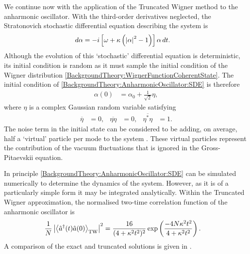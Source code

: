 We continue now with the application of the Truncated Wigner method to the anharmonic oscillator.  With the third-order derivatives neglected, the Stratonovich stochastic differential equation describing the system is
\begin{align}
    d \alpha &= -i \left[\omega + \kappa \left(\abs{\alpha}^2 - 1\right) \right] \alpha \, dt. \label{BackgroundTheory:AnharmonicOscillator:SDE}
\end{align}
Although the evolution of this `stochastic' differential equation is deterministic, its initial condition is random as it must sample the initial condition of the Wigner distribution \eqref{BackgroundTheory:WignerFunctionCoherentState}.  The initial condition of \eqref{BackgroundTheory:AnharmonicOscillator:SDE} is therefore
\begin{align}
    \alpha(0) &= \alpha_0 + \frac{1}{\sqrt{2}} \eta,
\end{align}
where $\eta$ is a complex Gaussian random variable satisfying
\begin{align}
    \overline{\eta} &= 0, & \overline{\eta \eta} &= 0, & \overline{\eta^* \eta} &= 1.
\end{align}
The noise term in the initial state can be considered to be adding, on average, half a `virtual' particle per mode to the system \citep{Scott:2007}.  These virtual particles represent the contribution of the vacuum fluctuations that is ignored in the Gross-Pitaevskii equation.

In principle \eqref{BackgroundTheory:AnharmonicOscillator:SDE} can be simulated numerically to determine the dynamics of the system.  However, as it is of a particularly simple form it may be integrated analytically.  Within the Truncated Wigner approximation, the normalised two-time correlation function of the anharmonic oscillator is
\begin{align}
    \frac{1}{N} \left| {\big<\hat{a}^\dagger(t) \hat{a}(0)\big>}_\text{TW}\right|^2 &= \frac{16}{(4 + \kappa^2 t^2)^2} \exp\left(\frac{- 4 N \kappa^2 t^2}{4 + \kappa^2 t^2} \right).
\end{align}
A comparison of the exact and truncated solutions is given in .

